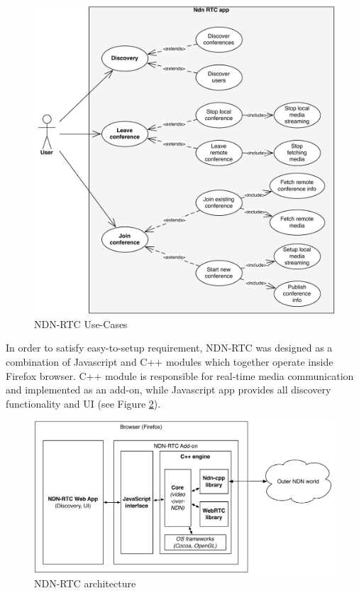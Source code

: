 \documentclass[12pt]{article}
\begin{document}
\begin{figure}[Hb!]
\centering
\includegraphics[width=\textwidth]{../res/graphics/addon-uc}
\caption{NDN-RTC Use-Cases}
\label{fig:uc}
\end{figure}

In order to satisfy easy-to-setup requirement, NDN-RTC was designed as a combination of Javascript and C++ modules which together operate inside Firefox browser. C++ module is responsible for real-time media communication and implemented as an add-on, while Javascript app provides all discovery functionality and UI (see Figure \ref{fig:arch}).

\begin{figure}[Ht!]
\centering
\includegraphics[width=\textwidth]{../res/graphics/addon-arch}
\caption{NDN-RTC architecture}
\label{fig:arch}
\end{figure} 
\end{document}

